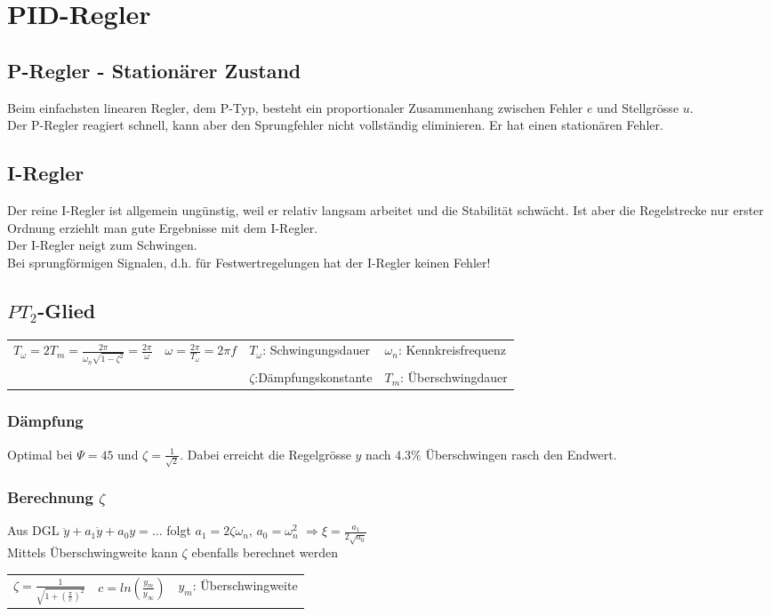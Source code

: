 \section{PID-Regler }

	\subsection{P-Regler - Stationärer Zustand }
		Beim einfachsten linearen Regler, dem P-Typ, besteht ein proportionaler
		Zusammenhang zwischen Fehler $e$ und Stellgrösse $u$.\\
		Der P-Regler reagiert schnell, kann aber den Sprungfehler nicht vollständig
		eliminieren. Er hat einen stationären Fehler.


	\subsection{I-Regler }
		Der reine I-Regler ist allgemein ungünstig, weil er relativ langsam arbeitet
		und die Stabilität schwächt. Ist aber die Regelstrecke nur erster Ordnung
		erziehlt man gute Ergebnisse mit dem I-Regler.\\
		Der I-Regler neigt zum Schwingen.\\
		Bei sprungförmigen Signalen, d.h. für Festwertregelungen hat der I-Regler
		keinen Fehler!


	\subsection{$PT_2$-Glied }
		\begin{tabular}{p{5cm}p{3cm}p{4cm}p{4cm}}
			$T_\omega = 2T_m=\frac{2\pi}{\omega_n \sqrt{1-\zeta^2}}=\frac{2\pi}{\omega}$ & $\omega = \frac{2\pi}{T_\omega}=2\pi f$ &  $T_\omega$: Schwingungsdauer & $\omega_n$: Kennkreisfrequenz\\
			& & $\zeta$:Dämpfungskonstante & $T_m$: Überschwingdauer
		\end{tabular}

		\subsubsection{Dämpfung}
		Optimal bei $\Psi=45$ und $\zeta=\frac{1}{\sqrt{2}}$.
		Dabei erreicht die Regelgrösse $y$ nach $4.3\%$ Überschwingen rasch den	Endwert.
		\subsubsection{Berechnung $\zeta$}
		Aus DGL $\ddot{y}+a_1\dot{y}+a_0 y=\ldots$ folgt $a_1=2\zeta\omega_n$, $a_0=\omega_n^2$ $\Rightarrow \xi=\frac{a_1}{2\sqrt{a_0}}$ \\
		Mittels Überschwingweite kann $\zeta$ ebenfalls berechnet werden\\
		\begin{tabular}{p{3cm}p{3cm}p{6cm}}
			$\zeta = \frac{1}{\sqrt{1+(\frac{\pi}{c})^2}}$ & $c =ln(\frac{y_m}{y_{\infty}})$ & $y_m$: Überschwingweite
		\end{tabular}

